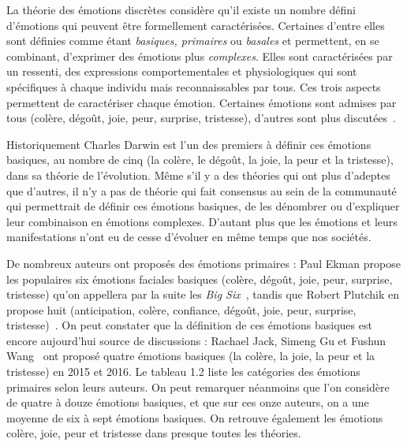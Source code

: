 La théorie des émotions discrètes considère qu'il existe un nombre défini d'émotions qui peuvent être formellement caractérisées. Certaines d'entre elles sont définies comme étant \textit{basiques, primaires} ou \textit{basales} et permettent, en se combinant, d'exprimer des émotions plus \textit{complexes}. Elles sont caractérisées par un ressenti, des expressions comportementales et physiologiques qui sont spécifiques à chaque individu mais reconnaissables par tous. Ces trois aspects permettent de caractériser chaque émotion. Certaines émotions sont admises par tous (colère, dégoût, joie, peur, surprise, tristesse), d'autres sont plus discutées~\cite{Cosnier1994}.

Historiquement Charles Darwin est l'un des premiers à définir ces émotions basiques, au nombre de cinq (la colère, le dégoût, la joie, la peur et la tristesse), dans sa théorie de l'évolution.
Même s'il y a des théories qui ont plus d'adeptes que d'autres, il n'y a pas de théorie qui fait consensus au sein de la communauté qui permettrait de définir ces émotions basiques, de les dénombrer ou d'expliquer leur combinaison en émotions complexes. D'autant plus que les émotions et leurs manifestations n'ont eu de cesse d'évoluer en même temps que nos sociétés.



De nombreux auteurs ont proposés des émotions primaires : Paul Ekman propose les populaires six émotions faciales basiques (colère, dégoût, joie, peur, surprise, tristesse) qu'on appellera par la suite les \textit{Big Six}~\cite{Ekman1999}, tandis que Robert Plutchik en propose huit (anticipation, colère, confiance, dégoût, joie, peur, surprise, tristesse)~\cite{Plutchik1980}. On peut constater que la définition de ces émotions basiques est encore aujourd'hui source de discussions : Rachael Jack, Simeng Gu et Fushun Wang~\cite{Jack2016,Gu2015,Wang2016} ont proposé quatre émotions basiques (la colère, la joie, la peur et la tristesse) en 2015 et 2016. Le tableau 1.2
 liste les catégories des émotions primaires selon leurs auteurs. On peut remarquer néanmoins que l'on considère de quatre à douze émotions basiques, et que sur ces onze auteurs, on a une moyenne de six à sept émotions basiques. On retrouve également les émotions colère, joie, peur et tristesse dans presque toutes les théories.

